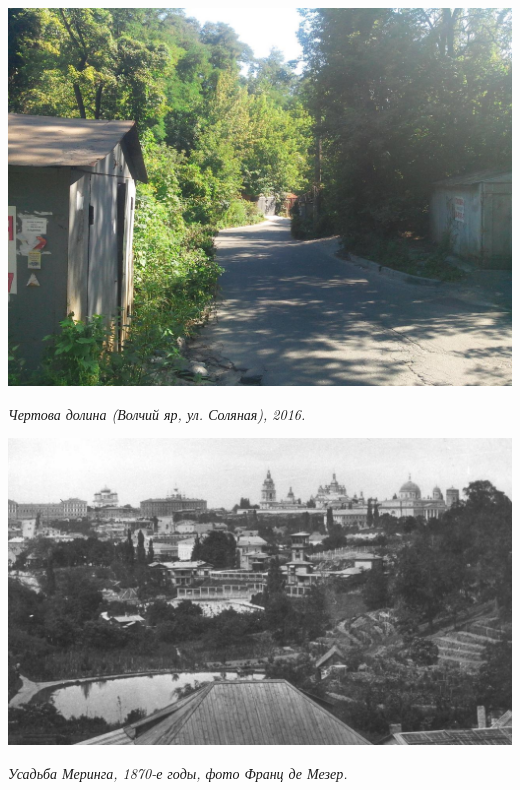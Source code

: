 \begin{center}
\includegraphics[width=\linewidth]{rpix/IMG_20160828_145732.jpg}

\textit{Чертова долина (Волчий яр, ул. Соляная), 2016.}
\end{center}


\begin{center}
\includegraphics[width=\linewidth]{rpix/meringa_usadba.jpg}

\textit{Усадьба Меринга, 1870-е годы, фото Франц де Мезер.}
\end{center}


